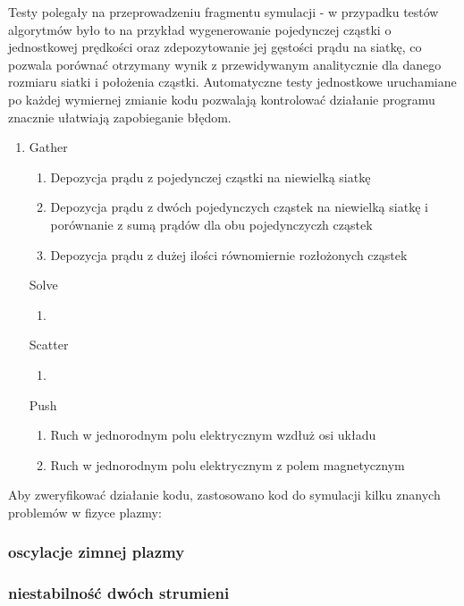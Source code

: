 Testy polegały na przeprowadzeniu fragmentu symulacji - w przypadku testów algorytmów było to na przykład wygenerowanie
pojedynczej cząstki o jednostkowej prędkości oraz zdepozytowanie jej gęstości prądu na siatkę, co pozwala porównać
otrzymany wynik z przewidywanym analitycznie dla danego rozmiaru siatki i położenia cząstki. Automatyczne testy
jednostkowe uruchamiane po każdej wymiernej zmianie kodu pozwalają kontrolować działanie programu znacznie ułatwiają
zapobieganie błędom.

\begin{enumerate}
    \item Gather
    \begin{enumerate}
        \item Depozycja prądu z pojedynczej cząstki na niewielką siatkę
        \item Depozycja prądu z dwóch pojedynczych cząstek na niewielką siatkę
              i porównanie z sumą prądów dla obu pojedynczyczh cząstek
        \item Depozycja prądu z dużej ilości równomiernie rozłożonych cząstek
    \end{enumerate}

    \itemi Solve
    \begin{enumerate}
        \item %
    \end{enumerate}

    \itemi Scatter
    \begin{enumerate}
        \item %
    \end{enumerate}

    \itemi Push
    \begin{enumerate}
        \item Ruch w jednorodnym polu elektrycznym wzdłuż osi układu
        \item Ruch w jednorodnym polu elektrycznym z polem magnetycznym %
    \end{enumerate}
\end{enumerate}

Aby zweryfikować działanie kodu, zastosowano kod do symulacji kilku znanych problemów w fizyce plazmy:
\subsubsection{oscylacje zimnej plazmy}
\subsubsection{niestabilność dwóch strumieni}

